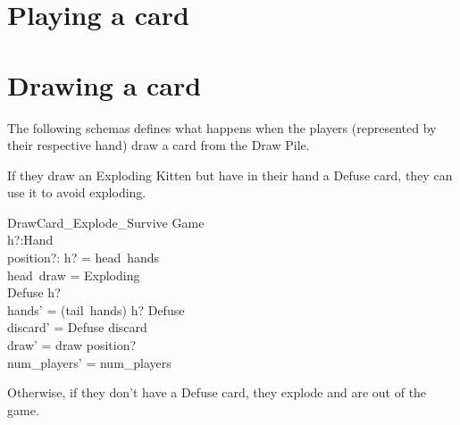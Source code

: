 \documentclass[11pt, fuzz]{article}
\begin{document}
\section{Playing a card}



\section{Drawing a card}

The following schemas defines what happens when the players (represented by their respective hand) draw a card from the Draw Pile. 

If they draw an Exploding Kitten but have in their hand a Defuse card, they can use it to avoid exploding. 

\begin{schema}{DrawCard\_Explode\_Survive}
    \Delta Game \\
    h?:Hand \\
    position?: \nat
\where
    h? = head~hands \\
    head~draw = Exploding \\
    Defuse \inbag h? \\
    hands' = (tail~hands) \cat \langle h? \uminus \lbag Defuse \rbag \rangle\\
    discard' = \langle Defuse \rangle \cat discard \\
    draw' = draw \insertHead position? \\
    num\_players' = num\_players
\end{schema}


Otherwise, if they don't have a Defuse card, they explode and are out of the game. 







\end{document}
